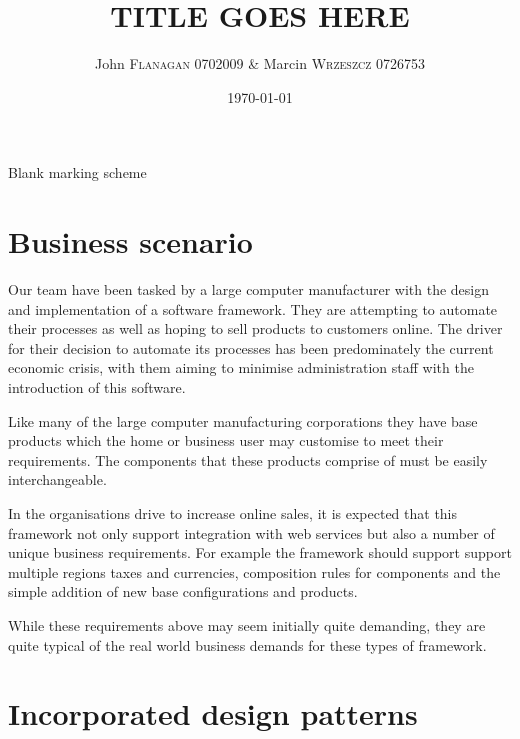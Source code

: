 \documentclass[pdftex,11pt,a4paper]{article}
\author{John \textsc{Flanagan} 0702009 \& Marcin \textsc{Wrzeszcz} 0726753 }
\title{TITLE GOES HERE}
\date{\today}
\begin{document}


\begin{center}
	Blank marking scheme
\end{center}

\pagebreak

\tableofcontents
\pagebreak

\section{Business scenario}
Our team have been tasked by a large computer manufacturer with the design and implementation of a software framework. They are attempting to automate their processes as well as hoping to sell products to customers online. The driver for their decision to automate  its processes has been predominately the current economic crisis, with them aiming to minimise administration staff with the introduction of this software. 

Like many of the large computer manufacturing corporations they have base products which the home or business user may customise to meet their requirements. The components that these products comprise of must be easily interchangeable. 

In the organisations drive to increase online sales, it is expected that this framework not only support integration with web services but also a number of unique business requirements. For example the framework should support support multiple regions taxes and currencies, composition rules for components and the simple addition of new base configurations and products.

While these requirements above may seem initially quite demanding, they are quite typical of the real world business demands for these types of framework.

\pagebreak
\section{Incorporated design patterns}
\end{document}
